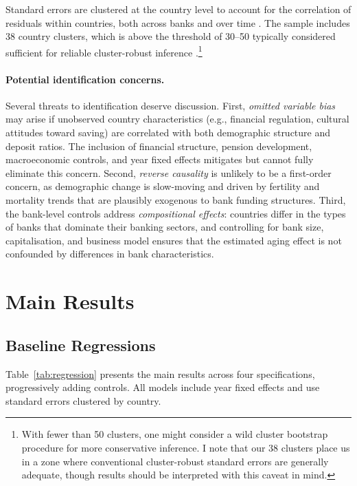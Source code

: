\documentclass[12pt,a4paper]{article}
\begin{document}
Standard errors are clustered at the country level to account for the correlation of residuals within countries, both across banks and over time \citep{Petersen2009}. The sample includes 38 country clusters, which is above the threshold of 30--50 typically considered sufficient for reliable cluster-robust inference \citep{Cameron2008}.\footnote{With fewer than 50 clusters, one might consider a wild cluster bootstrap procedure for more conservative inference. I note that our 38 clusters place us in a zone where conventional cluster-robust standard errors are generally adequate, though results should be interpreted with this caveat in mind.}

\paragraph{Potential identification concerns.} Several threats to identification deserve discussion. First, \textit{omitted variable bias} may arise if unobserved country characteristics (e.g., financial regulation, cultural attitudes toward saving) are correlated with both demographic structure and deposit ratios. The inclusion of financial structure, pension development, macroeconomic controls, and year fixed effects mitigates but cannot fully eliminate this concern. Second, \textit{reverse causality} is unlikely to be a first-order concern, as demographic change is slow-moving and driven by fertility and mortality trends that are plausibly exogenous to bank funding structures. Third, the bank-level controls address \textit{compositional effects}: countries differ in the types of banks that dominate their banking sectors, and controlling for bank size, capitalisation, and business model ensures that the estimated aging effect is not confounded by differences in bank characteristics.


\section{Main Results}
\label{sec:results}

\subsection{Baseline Regressions}

Table~\ref{tab:regression} presents the main results across four specifications, progressively adding controls. All models include year fixed effects and use standard errors clustered by country.
\end{document}
